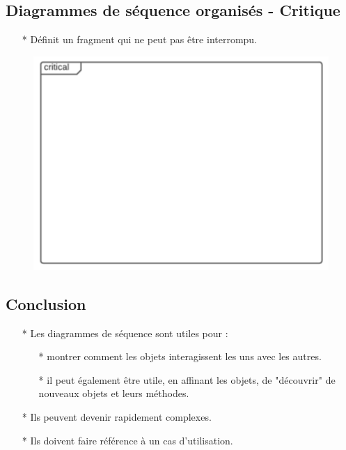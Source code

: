 \documentclass[12pt]{article}
\begin{document}
\subsection{Diagrammes de séquence organisés - Critique}
\begin{itemize}
	\item[*] Définit un fragment qui ne peut pas être interrompu.
\end{itemize}
\newpage
\begin{figure}[!hbtp]
	\centering
	\includegraphics[scale=0.75]{Capture10.PNG}
\end{figure}
\subsection{Conclusion}
\begin{itemize}
	\item[*] Les diagrammes de séquence sont utiles pour :
	\begin{itemize}
		\item[*] montrer comment les objets interagissent les uns avec les autres.
		\item[* ] il peut également être utile, en affinant les objets, de "découvrir" de nouveaux objets et leurs méthodes.
	\end{itemize}
	\item[* ] Ils peuvent devenir rapidement complexes.
	\item[* ] Ils doivent faire référence à un cas d'utilisation.
\end{itemize}
\end{document}
